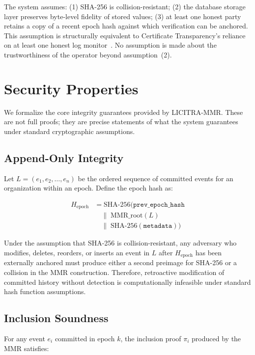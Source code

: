 \documentclass[sigconf,natbib=false]{acmart}
\begin{document}
The system assumes: (1) SHA-256 is collision-resistant; (2) the database
storage layer preserves byte-level fidelity of stored values; (3) at least
one honest party retains a copy of a recent epoch hash against which
verification can be anchored. This assumption is structurally equivalent
to Certificate Transparency's reliance on at least one honest log
monitor~\cite{laurie2013}. No assumption is made about the trustworthiness
of the operator beyond assumption~(2).


\section{Security Properties}
\label{sec:security}

We formalize the core integrity guarantees provided by LICITRA-MMR.
These are not full proofs; they are precise statements of what the
system guarantees under standard cryptographic assumptions.

\subsection{Append-Only Integrity}

Let $L = (e_1, e_2, \ldots, e_n)$ be the ordered sequence of committed
events for an organization within an epoch. Define the epoch hash as:

\begin{align*}
H_{\text{epoch}} &= \text{SHA-256}(\texttt{prev\_epoch\_hash} \\
  &\quad\|\; \text{MMR\_root}(L) \\
  &\quad\|\; \text{SHA-256}(\texttt{metadata}))
\end{align*}

Under the assumption that SHA-256 is collision-resistant, any adversary
who modifies, deletes, reorders, or inserts an event in $L$ after
$H_{\text{epoch}}$ has been externally anchored must produce either a
second preimage for SHA-256 or a collision in the MMR construction.
Therefore, retroactive modification of committed history without
detection is computationally infeasible under standard hash function
assumptions.

\subsection{Inclusion Soundness}

For any event $e_i$ committed in epoch $k$, the inclusion proof
$\pi_i$ produced by the MMR satisfies:
\end{document}
